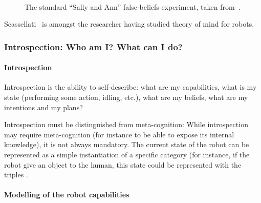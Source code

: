\begin{figure}
        \centering
         \hspace{15pt} %
         \\
         \hspace{15pt} %
        \caption{The standard ``Sally and Ann'' false-beliefs experiment, taken
        from~\cite{Leslie2000}.}

        \label{fig|sally-ann}
\end{figure}

Scassellati~\cite{Scassellati2002} is amongst the researcher having studied
theory of mind for robots.



\subsubsection{Introspection: Who am I? What can I do?}
\label{sect|introspection}

\paragraph{Introspection}

Introspection is the ability to self-describe: what are my capabilities, what
is my state (performing some action, idling, etc.), what are my beliefs, what
are my intentions and my plans?

Introspection must be distinguished from meta-cognition: While introspection
may require meta-cognition (for instance to be able to expose its internal
knowledge), it is not always mandatory. The current state of the robot can be
represented as a simple instantiation of a specific category (for instance, if
the robot give an object to the human, this state could be represented with the
triples .

\paragraph{Modelling of the robot capabilities}

